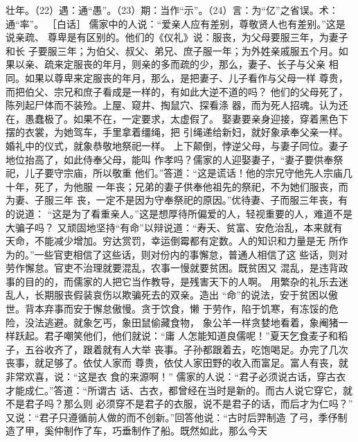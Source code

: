 \documentclass[12pt,UTF8]{ctexbook}
\begin{document}
壮年。（22）遇：通“愚”。（23）期：当作“示”。（24）言：为“亿”之省误。术：通“率”。 
［白话］ 
儒家中的人说：“爱亲人应有差别，尊敬贤人也有差别。”这是说亲疏、 
尊卑是有区别的。他们的《仪礼》说：服丧，为父母要服三年，为妻子和长 
子要服三年；为伯父、叔父、弟兄、庶子服一年；为外姓亲戚服五个月。如 
果以亲、疏来定服丧的年月，则亲的多而疏的少，那么，妻子、长子与父亲 
相同。如果以尊卑来定服丧的年月，那么，是把妻子、儿子看作与父母一样 
尊贵，而把伯父、宗兄和庶子看成是一样的，有如此大逆不道的吗？ 
他们的父母死了，陈列起尸体而不装殓。上屋、窥井、掏鼠穴、探看涤 
器，而为死人招魂。认为还在，愚蠢极了。如果不在，一定要求，太虚假了。 
娶妻要亲身迎接，穿着黑色下摆的衣裳，为她驾车，手里拿着缰绳，把 
引绳递给新妇，就好象承奉父亲一样。婚礼中的仪式，就象恭敬地祭祀一样。 
上下颠倒，悖逆父母，与妻子同位。妻子地位抬高了，如此侍奉父母，能叫 
作孝吗？儒家的人迎娶妻子，“妻子要供奉祭祀，儿子要守宗庙，所以敬重 
他们。”答道：“这是谎话！他的宗兄守他先人宗庙几十年，死了，为他服 
一年丧；兄弟的妻子供奉他祖先的祭祀，不为她们服丧，而为妻、子服三年 
丧，一定不是因为守奉祭祀的原因。”优待妻、子而服三年丧，有的说道： 
“这是为了看重亲人。”这是想厚待所偏爱的人，轻视重要的人，难道不是 
大骗子吗？ 
又顽固地坚持“有命”以辩说道：“寿夭、贫富、安危治乱，本来就有 
天命，不能减少增加。穷达赏罚，幸运倒霉都有定数。人的知识和力量是无 
所作为的。”一些官吏相信了这些话，则对份内的事懈怠，普通人相信了这 
些话，则对劳作懈怠。官吏不治理就要混乱，农事一慢就要贫困。既贫困又 
混乱，是违背政事的目的的，而儒家的人把它当作教导，是残害天下的人啊。 
用繁杂的礼乐去迷乱人，长期服丧假装哀伤以欺骗死去的双亲。造出 
“命”的说法，安于贫困以傲世。背本弃事而安于懈怠傲慢。贪于饮食，懒 
于劳作，陷于饥寒，有冻馁的危险，没法逃避。就象乞丐，象田鼠偷藏食物， 
象公羊一样贪婪地看着，象阉猪一样跃起。君子嘲笑他们，他们就说：“庸 
人怎能知道良儒呢！”夏天乞食麦子和稻子，五谷收齐了，跟着就有人大举 
丧事。子孙都跟着去，吃饱喝足。办完了几次丧事，就足够了。依仗人家而 
尊贵，依仗人家田野的收入而富足。富人有丧，就非常欢喜，说：“这是衣 
食的来源啊！” 
儒家的人说：“君子必须说古话，穿古衣才能成仁。”答道：“所谓古 
话、古衣，都曾经在当时是新的。而古人说它穿它，就不是君子吗？那么则 
必须穿不是君子的衣服，说不是君子的话，而后才为仁吗？” 
又说：“君子只遵循前人做的而不创新。”回答他说：“古时后羿制造 
了弓，季伃制造了甲，奚仲制作了车，巧垂制作了船。既然如此，那么今天 
\end{document}
